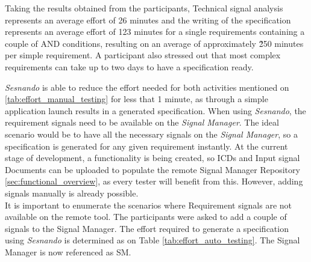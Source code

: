 Taking the results obtained from the participants, Technical signal analysis represents an average effort of 26 minutes and the writing of the specification represents an average effort of 123 minutes for a single requirements containing a couple of AND conditions, resulting on an average of approximately \~ 250 minutes per simple requirement. A participant also stressed out that most complex requirements can take up to two days to have a specification ready.

\textit{Sesnando} is able to reduce the effort needed for both activities mentioned on \ref{tab:effort_manual_testing} for less that 1 minute, as through a simple application launch results in a generated specification. When using \textit{Sesnando}, the requirement signals need to be available on the \textit{Signal Manager}. The ideal scenario would be to have all the necessary signals on the \textit{Signal Manager}, so a specification is generated for any given requirement instantly. At the current stage of development, a functionality is being created, so ICDs and Input signal Documents can be uploaded to populate the remote Signal Manager Repository \ref{sec:functional_overview}, as every tester will benefit from this. However, adding signals manually is already possible.\\

It is important to enumerate the scenarios where Requirement signals are not available on the remote tool. The participants were asked to add a couple of signals to the Signal Manager. The effort required to generate a specification using \textit{Sesnando} is determined as on Table \ref{tab:effort_auto_testing}.
The Signal Manager is now referenced as SM.

